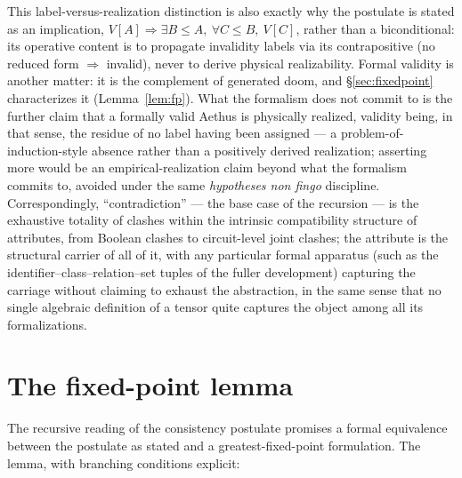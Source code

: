 This label-versus-realization distinction is also exactly why the postulate is stated as an implication, $V[A] \Rightarrow \exists B \le A,\ \forall C \le B,\ V[C]$, rather than a biconditional: its operative content is to propagate invalidity labels via its contrapositive (no reduced form $\Rightarrow$ invalid), never to derive physical realizability. Formal validity is another matter: it is the complement of generated doom, and \S\ref{sec:fixedpoint} characterizes it (Lemma~\ref{lem:fp}). What the formalism does not commit to is the further claim that a formally valid Aethus is physically realized, validity being, in that sense, the residue of no label having been assigned --- a problem-of-induction-style absence rather than a positively derived realization; asserting more would be an empirical-realization claim beyond what the formalism commits to, avoided under the same \emph{hypotheses non fingo} discipline. Correspondingly, ``contradiction'' --- the base case of the recursion --- is the exhaustive totality of clashes within the intrinsic compatibility structure of attributes, from Boolean clashes to circuit-level joint clashes; the attribute is the structural carrier of all of it, with any particular formal apparatus (such as the identifier--class--relation--set tuples of the fuller development) capturing the carriage without claiming to exhaust the abstraction, in the same sense that no single algebraic definition of a tensor quite captures the object among all its formalizations.

\section{The fixed-point lemma}\label{sec:fp}
\label{sec:fixedpoint}

The recursive reading of the consistency postulate promises a formal equivalence between the postulate as stated and a greatest-fixed-point formulation. The lemma, with branching conditions explicit:

